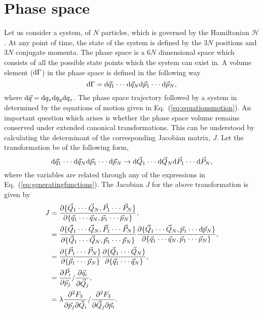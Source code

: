 \documentclass[a4paper]{article}
\begin{document}
\section{Phase space}
Let us consider a system, of $N$ particles, which is governed by the Hamiltonian $\mathcal{H}$. At any point of time, the state of the system is defined by the $3N$ positions and $3N$ conjugate momenta. The phase space is a $6N$ dimensional space which consists of all the possible state points which the system can exist in. A volume element (${\rm d}\Gamma$) in the phase space is defined in the following way
\begin{equation}
{\rm d\Gamma}={\rm d}\vec{q}_{1}\cdot\cdot\cdot{\rm d}\vec{q}_{N}{\rm d}\vec{p}_{1}\cdot\cdot\cdot{\rm d}\vec{p}_{N},
\end{equation}
where ${\rm d}\vec{q}={\rm d}q_{x}{\rm d}q_{y}{\rm d}q_{z}$. The phase space trajectory followed by a system in determined by the equations of motion given in Eq.~(\ref{eq:equationsmotion}). An important question which arises is whether the phase space volume remains conserved under extended canonical transformations. This can be understood by calculating the determinant of the corresponding Jacobian matrix, $J$. Let the transformation be of the following form,
\begin{equation}
{\rm d}\vec{q}_{1}\cdot\cdot\cdot{\rm d}\vec{q}_{N}{\rm d}\vec{p}_{1}\cdot\cdot\cdot{\rm d}\vec{p}_{N} \rightarrow {\rm d}\vec{Q}_{1}\cdot\cdot\cdot{\rm d}\vec{Q}_{N}{\rm d}\vec{P}_{1}\cdot\cdot\cdot{\rm d}\vec{P}_{N},
\end{equation} 
where the variables are related through any of the expressions in Eq.~(\ref{eq:generatingfunctions}). The Jacobian $J$ for the above transformation is given by
\begin{equation}
\begin{split}
J&=\frac{\partial \{\vec{Q}_{1}\cdot\cdot\cdot\vec{Q}_{N},\vec{P}_{1}\cdot\cdot\cdot\vec{P}_{N}\}}{\partial \{\vec{q}_{1}\cdot\cdot\cdot\vec{q}_{N},\vec{p}_{1}\cdot\cdot\cdot\vec{p}_{N}\}},\\
&=\frac{\partial \{\vec{Q}_{1}\cdot\cdot\cdot\vec{Q}_{N},\vec{P}_{1}\cdot\cdot\cdot\vec{P}_{N}\}}{\partial \{\vec{Q}_{1}\cdot\cdot\cdot\vec{Q}_{N},\vec{p}_{1}\cdot\cdot\cdot\vec{p}_{N}\}}\frac{\partial \{\vec{Q}_{1}\cdot\cdot\cdot\vec{Q}_{N},\vec{p}_{1}\cdot\cdot\cdot{\rm d}\vec{p}_{N}\}}{\partial \{\vec{q}_{1}\cdot\cdot\cdot\vec{q}_{N},\vec{p}_{1}\cdot\cdot\cdot\vec{p}_{N}\}},\\
&=\frac{\partial \{\vec{P}_{1}\cdot\cdot\cdot\vec{P}_{N}\}}{\partial \{\vec{p}_{1}\cdot\cdot\cdot\vec{p}_{N}\}}\frac{\partial \{\vec{Q}_{1}\cdot\cdot\cdot\vec{Q}_{N}\}}{\partial \{\vec{q}_{1}\cdot\cdot\cdot\vec{q}_{N}\}},\\
&=\frac{\partial \vec{P}_{i}}{\partial \vec{p}_{j}}/\frac{\partial \vec{q}_{i}}{\partial \vec{Q}_{j}},\\
&=\lambda\frac{\partial^{2} F_{3}}{\partial\vec{p}_{j}\partial \vec{Q}_{i}}/\frac{\partial^{2} F_{3}}{\partial\vec{Q}_{j}\partial \vec{p}_{i}}.
\end{split}
\end{equation}
\end{document}
